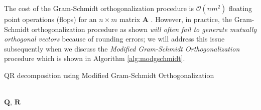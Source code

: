 \documentclass{article}[11pt]
\newcommand{\norm}[1]{\left|\left|#1\right|\right|}
\begin{document}
The cost of the Gram-Schmidt orthogonalization procedure is $\mathcal{O}(nm^{2})$ floating point operations (flops) for an $n\times{m}$ matrix $\mathbf{A}$ \cite{golub13}.
However, in practice, the Gram-Schmidt orthogonalization procedure as shown \emph{will often fail to generate mutually orthogonal vectors} because of rounding errors; we will address
this issue subsequently when we discuss the \emph{Modified Gram-Schmidt Orthogonalization} 
procedure which is shown in Algorithm \ref{alg:modgschmidt}.

\begin{algorithm}[H]
   \begin{algorithmic}[1]
   \caption{QR decomposition using Modified Gram-Schmidt Orthogonalization}\label{alg:modgschmidt}
   \EndFor

      \State{$\mathbf{q}_{j}\gets\mathbf{v}_{j}/\norm{\mathbf{v}_{j}}$}
      \EndFor
   \EndFor
   \\
   \Return $\mathbf{Q}$, $\mathbf{R}$
   \end{algorithmic}
\end{algorithm}
\end{document}
